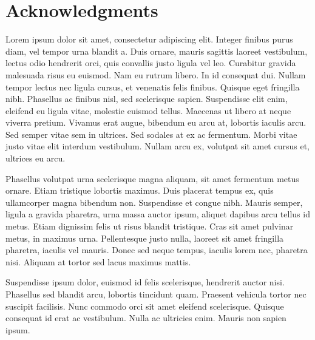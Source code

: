 \chapter{Acknowledgments}

Lorem ipsum dolor sit amet, consectetur adipiscing elit. Integer finibus purus diam, vel tempor urna blandit a. Duis ornare, mauris sagittis laoreet vestibulum, lectus odio hendrerit orci, quis convallis justo ligula vel leo. Curabitur gravida malesuada risus eu euismod. Nam eu rutrum libero. In id consequat dui. Nullam tempor lectus nec ligula cursus, et venenatis felis finibus. Quisque eget fringilla nibh. Phasellus ac finibus nisl, sed scelerisque sapien. Suspendisse elit enim, eleifend eu ligula vitae, molestie euismod tellus. Maecenas ut libero at neque viverra pretium. Vivamus erat augue, bibendum eu arcu at, lobortis iaculis arcu. Sed semper vitae sem in ultrices. Sed sodales at ex ac fermentum. Morbi vitae justo vitae elit interdum vestibulum. Nullam arcu ex, volutpat sit amet cursus et, ultrices eu arcu.

Phasellus volutpat urna scelerisque magna aliquam, sit amet fermentum metus ornare. Etiam tristique lobortis maximus. Duis placerat tempus ex, quis ullamcorper magna bibendum non. Suspendisse et congue nibh. Mauris semper, ligula a gravida pharetra, urna massa auctor ipsum, aliquet dapibus arcu tellus id metus. Etiam dignissim felis ut risus blandit tristique. Cras sit amet pulvinar metus, in maximus urna. Pellentesque justo nulla, laoreet sit amet fringilla pharetra, iaculis vel mauris. Donec sed neque tempus, iaculis lorem nec, pharetra nisi. Aliquam at tortor sed lacus maximus mattis.

Suspendisse ipsum dolor, euismod id felis scelerisque, hendrerit auctor nisi. Phasellus sed blandit arcu, lobortis tincidunt quam. Praesent vehicula tortor nec suscipit facilisis. Nunc commodo orci sit amet eleifend scelerisque. Quisque consequat id erat ac vestibulum. Nulla ac ultricies enim. Mauris non sapien ipsum.
